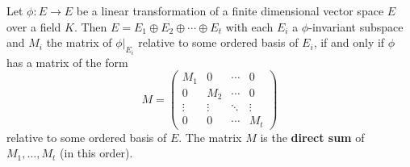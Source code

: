 Let $\phi : E \to E$ be a linear transformation of a finite dimensional vector space $E$ over a field $K$. Then $E = E_1 \oplus E_2 \oplus \cdots \oplus E_t$ with each $E_i$ a $\phi$-invariant subspace and $M_i$ the matrix of $\phi|_{E_i}$ relative to some ordered basis of $E_i$, if and only if $\phi$ has a matrix of the form
\[
M = \begin{pmatrix}
M_1 & 0 & \cdots & 0 \\
0 & M_2 & \cdots & 0 \\
\vdots & \vdots & \ddots & \vdots \\
0 & 0 & \cdots & M_t
\end{pmatrix}
\]
relative to some ordered basis of $E$. The matrix $M$ is the \textbf{direct sum} of $M_1, \ldots, M_t$ (in this order).
